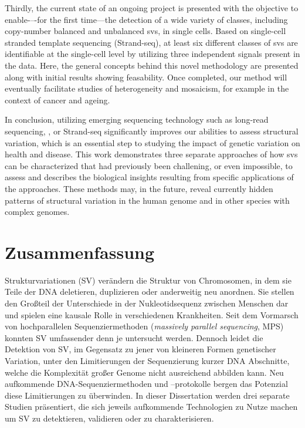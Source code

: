 Thirdly, the current state of an ongoing project is presented with the objective
to enable-–-for the first time---the detection of a wide variety of \sv classes,
including copy-number balanced and unbalanced \acp{sv}, in single cells. Based on
single-cell stranded template sequencing (Strand-seq), at least six different
classes of \acp{sv} are identifiable at the single-cell level by utilizing three
independent signals present in the data. Here, the general concepts behind this
novel methodology are presented along with initial results showing feasability.
Once completed, our method will eventually facilitate studies of \sv
heterogeneity and mosaicism, for example in the context of cancer and ageing.

In conclusion, utilizing emerging sequencing technology such as long-read
sequencing, \hic, or Strand-seq significantly improves our abilities to assess
structural variation, which is an essential step to studying the impact of
genetic variation on health and disease. This work demonstrates three separate
approaches of how \acp{sv} can be characterized that had previously been
challening, or even impossible, to assess and describes the biological insights
resulting from specific applications of the approaches. These methods may, in
the future, reveal currently hidden patterns of structural variation in the
human genome and in other species with complex genomes.




\cleardoublepage
{}
\chapter*{Zusammenfassung}%
%

Strukturvariationen (SV) verändern die Struktur von Chromosomen, in dem sie
Teile der DNA deletieren, duplizieren oder anderweitig neu anordnen. Sie stellen
den Großteil der Unterschiede in der Nukleotidsequenz zwischen Menschen dar und
spielen eine kausale Rolle in verschiedenen Krank\-hei\-ten. Seit dem Vormarsch
von hochparallelen Sequenziermethoden (\textit{massively parallel sequencing},
MPS) konnten SV umfassender denn je untersucht werden. Dennoch leidet die Detektion von
SV, im Gegensatz zu jener von kleineren Formen genetischer Variation, unter den
Limitierungen der Sequenzierung kurzer DNA Abschnitte, welche die Komplexität
großer Genome nicht ausreichend abbilden kann. Neu aufkommende
DNA-Se\-quen\-zier\-me\-tho\-den und –protokolle bergen das Potenzial diese Limitierungen
zu überwinden. In dieser Dissertation werden drei separate Studien präsentiert,
die sich jeweils aufkommende Technologien zu Nutze machen um SV zu detektieren,
validieren oder zu charakterisieren.


